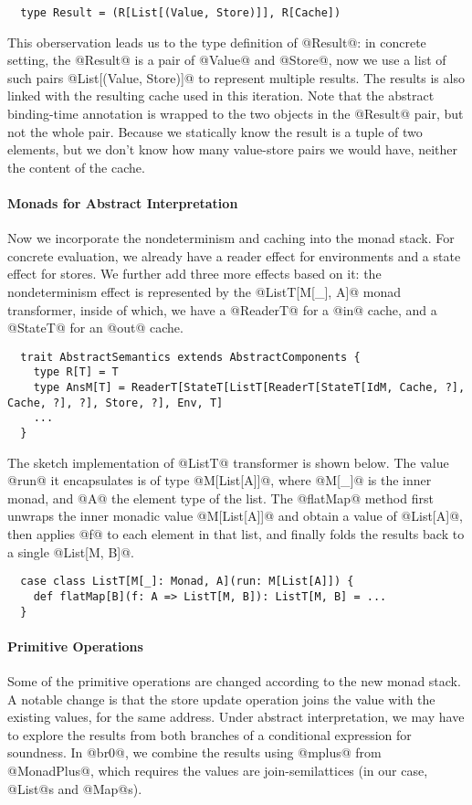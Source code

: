 \begin{lstlisting}
  type Result = (R[List[(Value, Store)]], R[Cache])
\end{lstlisting}

This oberservation leads us to the type definition of @Result@: in concrete setting,
the @Result@ is a pair of @Value@ and @Store@, now we use a list of such pairs
@List[(Value, Store)]@ to represent multiple results. The results is also linked
with the resulting cache used in this iteration.
Note that the abstract binding-time annotation is wrapped to the two objects in
the @Result@ pair, but not the whole pair. Because we statically know the result
is a tuple of two elements, but we don't know how many value-store pairs we
would have, neither the content of the cache.

\paragraph{Monads for Abstract Interpretation} Now we incorporate the
nondeterminism and caching into the monad stack. For concrete evaluation, we
already have a reader effect for environments and a state effect for stores. We
further add three more effects based on it: the nondeterminism effect is
represented by the @ListT[M[_], A]@ monad transformer, inside of which, we have
a @ReaderT@ for a @in@ cache, and a @StateT@ for an @out@ cache. 

\begin{lstlisting}
  trait AbstractSemantics extends AbstractComponents {
    type R[T] = T
    type AnsM[T] = ReaderT[StateT[ListT[ReaderT[StateT[IdM, Cache, ?], Cache, ?], ?], Store, ?], Env, T]
    ...
  }
\end{lstlisting}

The sketch implementation of @ListT@ transformer is shown below. The value @run@
it encapsulates is of type @M[List[A]]@, where @M[_]@ is the inner monad, and
@A@ the element type of the list. The @flatMap@ method first unwraps the inner
monadic value @M[List[A]]@ and obtain a value of @List[A]@, then applies @f@ to
each element in that list, and finally folds the results back to a single
@List[M, B]@.

\begin{lstlisting}
  case class ListT[M[_]: Monad, A](run: M[List[A]]) {
    def flatMap[B](f: A => ListT[M, B]): ListT[M, B] = ...
  }
\end{lstlisting}

\paragraph{Primitive Operations} Some of the primitive operations are changed
according to the new monad stack. A notable change is that the store update
operation joins the value with the existing values, for the same address. Under
abstract interpretation, we may have to explore the results from both branches
of a conditional expression for soundness. In @br0@, we combine the results
using @mplus@ from @MonadPlus@, which requires the values are join-semilattices
(in our case, @List@s and @Map@s).

